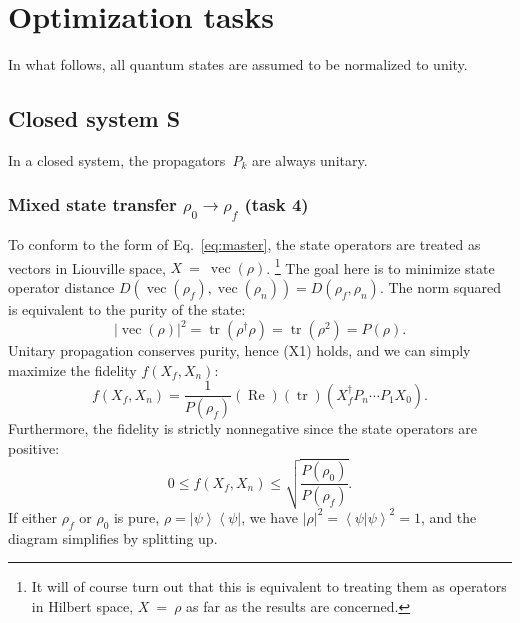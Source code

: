 \documentclass[aps, pra, a4paper, longbibliography]{revtex4}
\newcommand{\be}{\begin{equation}}
\newcommand{\ee}{\end{equation}}
\newcommand{\braket}[2]{\left \langle #1 | #2 \right \rangle}
\newcommand{\ketbra}[2]{\left| #1 \right \rangle \left \langle #2 \right|}
\DeclareMathOperator{\tr}{tr}
\DeclareMathOperator{\re}{Re}
\DeclareMathOperator{\cvec}{vec}
\begin{document}
\section{Optimization tasks}

In what follows, all quantum states are assumed to be normalized to unity.


\subsection{Closed system S}

In a closed system, the propagators~$P_k$ are always unitary.

\subsubsection{Mixed state transfer $\rho_0 \to \rho_f$ (task 4)}
\label{sec:closed-mixed}

To conform to the form of Eq.~\eqref{eq:master},
the state operators are treated as vectors in Liouville space, $X~=~\cvec(\rho)$.
\footnote{It will of course turn out that this is equivalent to treating them as operators in Hilbert
space, $X~=~\rho$ as far as the results are concerned.}
The goal here is to minimize state operator distance
$D(\cvec(\rho_f), \cvec(\rho_n)) = D(\rho_f, \rho_n)$.
The norm squared is equivalent to the purity of the state:
\be
|\cvec(\rho)|^2
= \tr(\rho^\dagger \rho)
= \tr(\rho^2)
= P(\rho).
\ee
Unitary propagation conserves purity, hence (X1) holds, and we can
simply maximize the fidelity $f(X_f, X_n)$:
\be
f(X_f, X_n)
= \frac{1}{P(\rho_f)} (\re) (\tr) \left( X_f^\dagger  P_n \cdots P_1 X_0 \right).
\ee
Furthermore, the fidelity is strictly nonnegative since the
state operators are positive:
\be
0 \le f(X_f, X_n) \le \sqrt{\frac{P(\rho_0)}{P(\rho_f)}}.
\ee
If either $\rho_f$ or $\rho_0$ is pure,
$\rho = \ketbra{\psi}{\psi}$,
we have $|\rho|^2 = \braket{\psi}{\psi}^2 = 1$, and
the diagram simplifies by splitting up.
\end{document}
